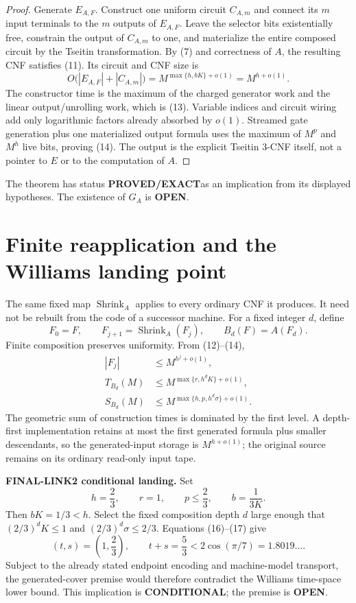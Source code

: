 \documentclass[11pt]{article}
\newcommand{\PROVED}{\textcolor{proved}{\textbf{PROVED/EXACT}}}
\newcommand{\COND}{\textcolor{conditional}{\textbf{CONDITIONAL}}}
\newcommand{\OPEN}{\textcolor{openstatus}{\textbf{OPEN}}}
\begin{document}
\begin{proof}
Generate $E_{A,F}$.  Construct one uniform circuit $C_{A,m}$ and connect its
$m$ input terminals to the $m$ outputs of $E_{A,F}$.  Leave the selector bits
existentially free, constrain the output of $C_{A,m}$ to one, and materialize
the entire composed circuit by the Tseitin transformation.  By (7) and
correctness of $A$, the resulting CNF satisfies (11).  Its circuit and CNF
size is
\[
 O\bigl(|E_{A,F}|+|C_{A,m}|\bigr)
 =M^{\max\{h,bK\}+o(1)}=M^{h+o(1)}.
\]
The constructor time is the maximum of the charged generator work and the
linear output/unrolling work, which is (13).  Variable indices and circuit
wiring add only logarithmic factors already absorbed by $o(1)$.  Streamed gate generation plus
one materialized output formula uses the maximum of $M^p$ and $M^h$ live
bits, proving (14).  The output is the explicit Tseitin 3-CNF itself, not a
pointer to $E$ or to the computation of $A$.
\end{proof}

The theorem has status \PROVED as an implication from its displayed
hypotheses.  The existence of $G_A$ is \OPEN.

\section{Finite reapplication and the Williams landing point}

The same fixed map $\operatorname{Shrink}_A$ applies to every ordinary CNF it
produces.  It need not be rebuilt from the code of a successor machine.  For a
fixed integer $d$, define
\[
 F_0=F,\qquad F_{j+1}=\operatorname{Shrink}_A(F_j),
 \qquad B_d(F)=A(F_d).
\]
Finite composition preserves uniformity.  From (12)--(14),
\begin{align}
 |F_j|&\le M^{h^j+o(1)},                                 \tag{15}\\
 T_{B_d}(M)&\le M^{\max\{r,h^dK\}+o(1)},                \tag{16}\\
 S_{B_d}(M)&\le M^{\max\{h,p,h^d\sigma\}+o(1)}.        \tag{17}
\end{align}
The geometric sum of construction times is dominated by the first level.  A
depth-first implementation retains at most the first generated formula plus
smaller descendants, so the generated-input storage is $M^{h+o(1)}$; the
original source remains on its ordinary read-only input tape.

\begin{conditionalbox}
\textbf{FINAL-LINK2 conditional landing.}
Set
\[
 h=\frac23,\qquad r=1,\qquad p\le\frac23,
 \qquad b=\frac{1}{3K}.
\]
Then $bK=1/3<h$.  Select the fixed composition depth $d$ large enough that
$(2/3)^dK\le1$ and $(2/3)^d\sigma\le2/3$.  Equations (16)--(17) give
\[
 (t,s)=\left(1,\frac23\right),\qquad
 t+s=\frac53<2\cos(\pi/7)=1.8019\ldots.
\]
Subject to the already stated endpoint encoding and machine-model transport,
the generated-cover premise would therefore contradict the Williams
time-space lower bound.  This implication is \COND; the premise is \OPEN.
\end{conditionalbox}
\end{document}
